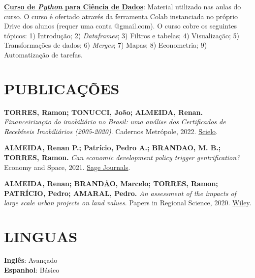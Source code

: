 \documentclass[margin]{res}
\begin{document}
\begin{resume}
\href{https://github.com/rsnatorres/curso_python_dados}{\textbf{Curso de \textit{Python} para Ciência de Dados}}: Material utilizado nas aulas do curso. O curso é ofertado através da ferramenta Colab instanciada no próprio Drive dos alunos (requer uma conta @gmail.com). O curso cobre os seguintes tópicos: 1) Introdução; 2) \textit{Dataframes}; 3) Filtros e tabelas; 4) Visualização; 5) Transformações de dados; 6) \textit{Merges}; 7) Mapas; 8) Econometria; 9) Automatização de tarefas.


\section{PUBLICAÇÕES}

\textbf{TORRES, Ramon; TONUCCI, João; ALMEIDA, Renan.} \textit{Financeirização do imobiliário no Brasil: uma análise dos Certificados de Recebíveis Imobiliários (2005-2020)}. Cadernos Metrópole, 2022. \href{https://www.scielo.br/j/cm/a/Vb9yvGf34vP9sthm5RXhbBy/?lang=pt}{Scielo}.


\textbf{ALMEIDA, Renan P.; Patrício, Pedro A.; BRANDAO, M. B.; TORRES, Ramon.} \textit{Can economic development policy trigger gentrification?} Economy and Space, 2021. \href{https://journals.sagepub.com/doi/10.1177/0308518X211050076}{Sage Journals}.

\textbf{ALMEIDA, Renan; BRANDÃO, Marcelo; TORRES, Ramon; PATRÍCIO, Pedro; AMARAL, Pedro.} \textit{An assessment of the impacts of large scale urban projects on land values}. Papers in Regional Science, 2020. \href{https://rsaiconnect.onlinelibrary.wiley.com/doi/10.1111/pirs.12572}{Wiley}.


\section{LINGUAS}
\textbf{Inglês}: Avançado\\
\textbf{Espanhol}: Básico

\end{resume}
\end{document}
